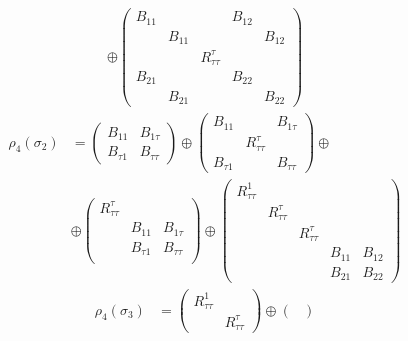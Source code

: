 \begin{example}
\begin{equation}
\begin{aligned}
      \oplus
      \begin{pmatrix}
        B_{11} &        &          & B_{12} & \\
               & B_{11} &          &        & B_{12} \\
               &        & R_{ττ}^τ \\
        B_{21} &        &          & B_{22} & \\
               & B_{21} &          &        & B_{22}
      \end{pmatrix}
    \end{aligned}
  \end{equation}
  \begin{equation}
    \begin{aligned}
      ρ_4(σ_2) &=
      \begin{pmatrix}
        B_{11} & B_{1τ} \\
        B_{τ1} & B_{ττ}
      \end{pmatrix}
      \oplus
      \begin{pmatrix}
        B_{11} & & B_{1τ} \\
        & R_{ττ}^τ \\
        B_{τ1} & & B_{ττ}
      \end{pmatrix}
      \oplus \\
      & \oplus
      \begin{pmatrix}
        R_{ττ}^τ \\
        & B_{11} & B_{1τ} \\
        & B_{τ1} & B_{ττ} \\
      \end{pmatrix}
      \oplus
      \begin{pmatrix}
        R_{ττ}^1 \\
        & R_{ττ}^τ \\
        & & R_{ττ}^τ \\
        & & & B_{11} & B_{12} \\
        & & & B_{21} & B_{22}
      \end{pmatrix}
    \end{aligned}
  \end{equation}
  \begin{equation}
    \begin{aligned}
      ρ_4(σ_3) &=
      \begin{pmatrix}
        R_{ττ}^1 \\
        & R_{ττ}^τ
      \end{pmatrix}
      \oplus
      \begin{pmatrix}

\end{pmatrix}
\end{aligned}
\end{equation}
\end{example}
